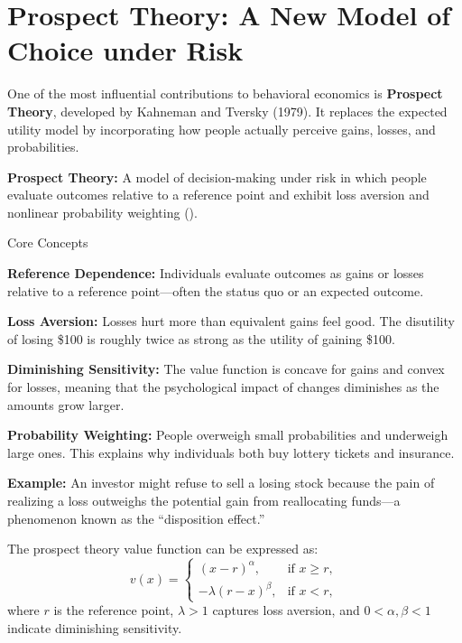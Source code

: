 \documentclass[11pt]{book}
\begin{document}
\section*{Prospect Theory: A New Model of Choice under Risk}

One of the most influential contributions to behavioral economics is \textbf{Prospect Theory}, developed by Kahneman and Tversky (1979). It replaces the expected utility model by incorporating how people actually perceive gains, losses, and probabilities.

\begin{definitionbox}
\textbf{Prospect Theory:} A model of decision-making under risk in which people evaluate outcomes relative to a reference point and exhibit loss aversion and nonlinear probability weighting (\citealp{Kahneman1979}).
\end{definitionbox}

Core Concepts

\textbf{Reference Dependence:}  
Individuals evaluate outcomes as gains or losses relative to a reference point—often the status quo or an expected outcome.

\textbf{Loss Aversion:}  
Losses hurt more than equivalent gains feel good. The disutility of losing \$100 is roughly twice as strong as the utility of gaining \$100.

\textbf{Diminishing Sensitivity:}  
The value function is concave for gains and convex for losses, meaning that the psychological impact of changes diminishes as the amounts grow larger.

\textbf{Probability Weighting:}  
People overweigh small probabilities and underweigh large ones. This explains why individuals both buy lottery tickets and insurance.

\begin{examplebox}
\textbf{Example:}  
An investor might refuse to sell a losing stock because the pain of realizing a loss outweighs the potential gain from reallocating funds—a phenomenon known as the ``disposition effect.''
\end{examplebox}

The prospect theory value function can be expressed as:
\[
v(x) = 
\begin{cases}
(x - r)^{\alpha}, & \text{if } x \ge r, \\
-\lambda (r - x)^{\beta}, & \text{if } x < r,
\end{cases}
\]
where \(r\) is the reference point, \(\lambda > 1\) captures loss aversion, and \(0 < \alpha, \beta < 1\) indicate diminishing sensitivity.
\end{document}
